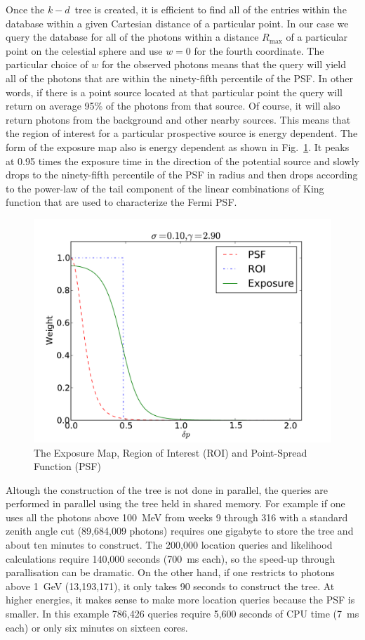 \documentclass[useAMS,usenatbib]{mn2e}
\begin{document}
Once the $k-d$~tree is created, it is efficient to find all of the
entries within the database within a given Cartesian distance of a
particular point.  In our case we query the database for all of the
photons within a distance $R_\mathrm{max}$ of a particular point on
the celestial sphere and use $w=0$ for the fourth coordinate.  The
particular choice of $w$ for the observed photons means that the query
will yield all of the photons that are within the ninety-fifth
percentile of the PSF.  In other words, if there is a point source
located at that particular point the query will return on average 95\%
of the photons from that source.  Of course, it will also return
photons from the background and other nearby sources.  This means that
the region of interest for a particular prospective source is energy
dependent.  The form of the exposure map also is energy dependent as
shown in Fig.~\ref{fig:expmap}.  It peaks at 0.95 times the exposure
time in the direction of the potential source and slowly drops to the
ninety-fifth percentile of the PSF in radius and then drops according
to the power-law of the tail component of the linear combinations of
King function that are used to characterize the Fermi PSF. 
\begin{figure}
\includegraphics[width=\columnwidth]{expmap}
\caption{The Exposure Map, Region of Interest (ROI)
  and Point-Spread Function (PSF)}
\label{fig:expmap}
\end{figure}

Altough the construction of the tree is not done in parallel, the
queries are performed in parallel using the tree held in shared
memory.  For example if one uses all the photons above 100~MeV from
weeks 9 through 316 with a standard zenith angle cut (89,684,009
photons) requires one gigabyte to store the tree and about ten minutes
to construct.  The 200,000 location queries and likelihood
calculations require 140,000 seconds (700~ms each), so the
speed-up through parallisation can be dramatic.  On the other hand, if
one restricts to photons above 1~GeV (13,193,171), it only takes 90
seconds to construct the tree.  At higher energies, it makes sense to
make more location queries because the PSF is smaller.  In this
example 786,426 queries require 5,600 seconds of CPU time (7~ms each)
or only six minutes on sixteen cores.
\end{document}
